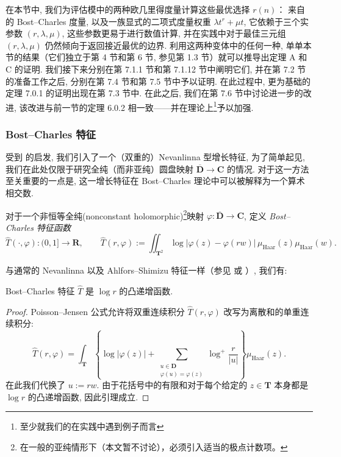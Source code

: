 在本节中, 我们为评估模中的两种欧几里得度量计算这些最优选择 \(r(n)\)：
来自 \cite{BC22} 的 Bost--Charles 度量, 
以及一族显式的二项式度量权重 \(\lambda t^r + \mu t\), 
它依赖于三个实参数 \((r,\lambda,\mu)\), 
这些参数更易于进行数值计算, 并在实践中对于最佳三元组 \((r,\lambda,\mu)\) 仍然倾向于返回接近最优的边界. 
利用这两种变体中的任何一种, 单单本节的结果（它们独立于第 4 节和第 6 节, 参见第 1.3 节）就可以推导出定理 A 和 C 的证明. 
我们接下来分别在第 7.1.1 节和第 7.1.12 节中阐明它们, 
并在第 7.2 节的准备工作之后, 分别在第 7.4 节和第 7.5 节中予以证明. 
在此过程中, 更为基础的定理 7.0.1 的证明出现在第 7.3 节中. 
在此之后, 我们在第 7.6 节中讨论进一步的改进, 
该改进与前一节的定理 6.0.2 相一致——并在理论上\footnote{至少就我们的在实践中遇到例子而言}予以加强.

\subsubsection{Bost--Charles 特征}\label{sec:7.1.1}

受到 \cite[第 5 节]{BC22} 的启发, 我们引入了一个（双重的）Nevanlinna 型增长特征, 
为了简单起见, 我们在此处仅限于研究全纯（而非亚纯）圆盘映射 \(\overline{\mathbf{D}} \to \mathbf{C}\) 的情况. 
对于这一方法至关重要的一点是, 这一增长特征在 Bost--Charles 理论中可以被解释为一个算术相交数.

\begin{definition}\label{def:7.1.2}
对于一个非恒等全纯(nonconstant holomorphic)\footnote{在一般的亚纯情形下（本文暂不讨论），必须引入适当的极点计数项。}映射 \(\varphi : \overline{\mathbf{D}} \to \mathbf{C}\), 
定义 \emph{Bost--Charles 特征函数} 
\begin{equation}\label{eq:7.1.3}
\widehat{T}(\cdot,\varphi):(0,1]\to\mathbf{R},\qquad \widehat{T}(r,\varphi):=\iint_{\mathbf{T}^2}\log|\varphi(z)-\varphi(rw)|\,\mu_{\mathrm{Haar}}(z)\mu_{\mathrm{Haar}}(w).
\end{equation}
\end{definition}

与通常的 Nevanlinna 以及 Ahlfors--Shimizu 特征一样（参见 \cite[第 3.3.5 节]{Nev70} 或 \cite[注记 13.3.8]{BG06}）, 我们有:

\begin{lemma}\label{lem:7.1.4}
Bost--Charles 特征 \(\widehat{T}\) 是 \(\log r\) 的凸递增函数.
\end{lemma}

\begin{proof}
Poisson--Jensen 公式允许将双重连续积分 \(\widehat{T}(r,\varphi)\) 改写为离散和的单重连续积分:
\begin{equation}\label{eq:7.1.5}
\widehat{T}(r,\varphi) = \int_{\mathbf{T}} \left\{ \log |\varphi(z)| + \sum_{\substack{u \in \mathbf{D} \\ \varphi(u) = \varphi(z)}} \log^{+} \frac{r}{|u|} \right\} \mu_{\text{Haar}}(z).
\end{equation}
在此我们代换了 \(u := rw\). 
由于花括号中的有限和对于每个给定的 \(z \in \mathbf{T}\) 本身都是 \(\log r\) 的凸递增函数, 
因此引理成立.
\end{proof}

